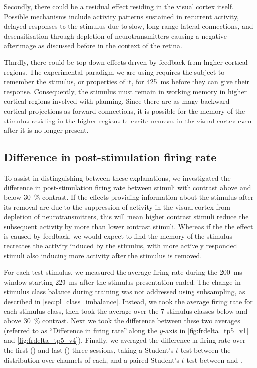 
Secondly, there could be a residual effect residing in the visual cortex itself.
Possible mechanisms include activity patterns sustained in recurrent activity, delayed responses to the stimulus due to slow, long-range lateral connections, and desensitisation through depletion of neurotransmitters causing a negative afterimage as discussed before in the context of the retina.

Thirdly, there could be top-down effects driven by feedback from higher cortical regions.
The experimental paradigm we are using requires the subject to remember the stimulus, or properties of it, for \SI{425}{\milli\second} before they can give their response.
Consequently, the stimulus must remain in working memory in higher cortical regions involved with planning.
Since there are as many backward cortical projections as forward connections, it is possible for the memory of the stimulus residing in the higher regions to excite neurons in the visual cortex even after it is no longer present.


\subsection{Difference in post-stimulation firing rate}

To assist in distinguishing between these explanations, we investigated the difference in post-stimulation firing rate between stimuli with contrast above and below \SI{30}{\percent} contrast.
If the effects providing information about the stimulus after its removal are due to the suppression of activity in the visual cortex from depletion of neurotransmitters, this will mean higher contrast stimuli reduce the subsequent activity by more than lower contrast stimuli.
Whereas if the the effect is caused by feedback, we would expect to find the memory of the stimulus recreates the activity induced by the stimulus, with more actively responded stimuli also inducing more activity after the stimulus is removed.

For each test stimulus, we measured the average firing rate during the \SI{200}{\milli\second} window starting \SI{220}{\milli\second} after the stimulus presentation ended.
The change in stimulus class balance during training was not addressed using subsampling, as described in \autoref{sec:pl_class_imbalance}.
Instead, we took the average firing rate for each stimulus class, then took the average over the \num{7} stimulus classes below and above \SI{30}{\percent} contrast.
Next we took the difference between these two averages (referred to as ``Difference in firing rate'' along the $y$-axis in \autoref{fig:frdelta_tp5_v1} and \autoref{fig:frdelta_tp5_v4}).
Finally, we averaged the difference in firing rate over the first () and last () three sessions, taking a Student's $t$-test between the distribution over channels of each, and a paired Student's $t$-test between  and .


